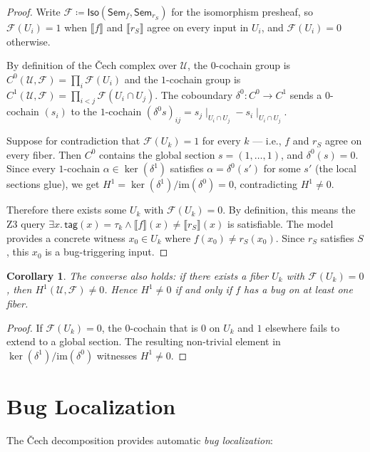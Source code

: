 \documentclass[11pt,a4paper]{report}
\theoremstyle{definition}
\theoremstyle{plain}
\newtheorem{corollary}[definition]{Corollary}
\newcommand{\den}[1]{\llbracket #1 \rrbracket}
\newcommand{\covers}{\mathcal{U}}
\newcommand{\Sem}{\mathsf{Sem}}
\newcommand{\Iso}{\mathsf{Iso}}
\newcommand{\Hone}{H^1}
\newcommand{\presheaf}{\mathcal{F}}
\newcommand{\restr}[2]{#1\!\!\mid_{#2}}
\begin{document}
\begin{proof}
Write $\presheaf \coloneqq \Iso(\Sem_f, \Sem_{r_S})$ for the
isomorphism presheaf, so $\presheaf(U_i) = 1$ when $\den{f}$ and
$\den{r_S}$ agree on every input in $U_i$, and $\presheaf(U_i) = 0$
otherwise.

By definition of the \v{C}ech complex over $\covers$, the $0$-cochain
group is $C^0(\covers, \presheaf) = \prod_i \presheaf(U_i)$ and the
$1$-cochain group is $C^1(\covers, \presheaf) = \prod_{i < j}
\presheaf(U_i \cap U_j)$.  The coboundary $\delta^0 : C^0 \to C^1$
sends a $0$-cochain $(s_i)$ to the $1$-cochain
$(\delta^0 s)_{ij} = \restr{s_j}{U_i \cap U_j} - \restr{s_i}{U_i \cap U_j}$.

Suppose for contradiction that $\presheaf(U_k) = 1$ for every $k$ ---
i.e., $f$ and $r_S$ agree on every fiber.  Then $C^0$ contains the
global section $s = (1, \ldots, 1)$, and $\delta^0(s) = 0$.  Since
every $1$-cochain $\alpha \in \ker(\delta^1)$ satisfies $\alpha = 
\delta^0(s')$ for some $s'$ (the local sections glue), we get
$\Hone = \ker(\delta^1) / \mathrm{im}(\delta^0) = 0$,
contradicting $\Hone \neq 0$.

Therefore there exists some $U_k$ with $\presheaf(U_k) = 0$.  By
definition, this means the Z3 query
$\exists x.\, \mathsf{tag}(x) = \tau_k \land \den{f}(x) \neq
\den{r_S}(x)$ is satisfiable.  The model provides a concrete
witness $x_0 \in U_k$ where $f(x_0) \neq r_S(x_0)$.  Since $r_S$
satisfies $S$, this $x_0$ is a bug-triggering input.
\end{proof}

\begin{corollary}
The converse also holds: if there exists a fiber $U_k$ with
$\presheaf(U_k) = 0$, then $\Hone(\covers, \presheaf) \neq 0$.
Hence $\Hone \neq 0$ if and only if $f$ has a bug on at least one
fiber.
\end{corollary}

\begin{proof}
If $\presheaf(U_k) = 0$, the $0$-cochain that is $0$ on $U_k$ and
$1$ elsewhere fails to extend to a global section.  The resulting
non-trivial element in $\ker(\delta^1) / \mathrm{im}(\delta^0)$
witnesses $\Hone \neq 0$.
\end{proof}

\section{Bug Localization}

The \v{C}ech decomposition provides automatic \emph{bug localization}:
\end{document}
